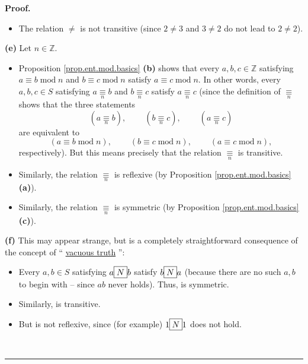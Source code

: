 \documentclass[numbers=enddot,12pt,final,onecolumn,notitlepage]{scrartcl}%
\numberwithin{exer}{subsection}
\theoremstyle{definition}
\newenvironment{proof}[1][Proof]{\noindent\textbf{#1.} }{\ \rule{0.5em}{0.5em}}
\begin{document}
\begin{proof}
\begin{itemize}
\item The relation $\neq$ is not transitive (since $2\neq3$ and $3\neq2$ do
not lead to $2\neq2$).
\end{itemize}

\textbf{(e)} Let $n\in\mathbb{Z}$.

\begin{itemize}
\item Proposition \ref{prop.ent.mod.basics} \textbf{(b)} shows that every
$a,b,c\in\mathbb{Z}$ satisfying $a\equiv b\operatorname{mod}n$ and $b\equiv
c\operatorname{mod}n$ satisfy $a\equiv c\operatorname{mod}n$. In other words,
every $a,b,c\in S$ satisfying $a\underset{n}{\equiv}b$ and
$b\underset{n}{\equiv}c$ satisfy $a\underset{n}{\equiv}c$ (since the
definition of $\underset{n}{\equiv}$ shows that the three statements
\[
\left(  a\underset{n}{\equiv}b\right)  ,\ \ \ \ \ \ \ \ \ \ \left(
b\underset{n}{\equiv}c\right)  ,\ \ \ \ \ \ \ \ \ \ \left(
a\underset{n}{\equiv}c\right)
\]
are equivalent to%
\[
\left(  a\equiv b\operatorname{mod}n\right)  ,\ \ \ \ \ \ \ \ \ \ \left(
b\equiv c\operatorname{mod}n\right)  ,\ \ \ \ \ \ \ \ \ \ \left(  a\equiv
c\operatorname{mod}n\right)  ,
\]
respectively). But this means precisely that the relation $\underset{n}{\equiv
}$ is transitive.

\item Similarly, the relation $\underset{n}{\equiv}$ is reflexive (by
Proposition \ref{prop.ent.mod.basics} \textbf{(a)}).

\item Similarly, the relation $\underset{n}{\equiv}$ is symmetric (by
Proposition \ref{prop.ent.mod.basics} \textbf{(c)}).
\end{itemize}

\textbf{(f)} This may appear strange, but is a completely straightforward
consequence of the concept of \textquotedblleft%
\href{https://en.wikipedia.org/wiki/Vacuous_truth}{vacuous truth}%
\textquotedblright:

\begin{itemize}
\item Every $a,b\in S$ satisfying $a\fbox{$N$}b$ satisfy $b\fbox{$N$}a$
(because there are no such $a,b$ to begin with -- since $a$$b$ never
holds). Thus,  is symmetric.

\item Similarly,  is transitive.

\item But  is not reflexive, since (for example) $1\fbox{$N$}1$ does
not hold.
\end{itemize}


\end{proof}
\end{document}
